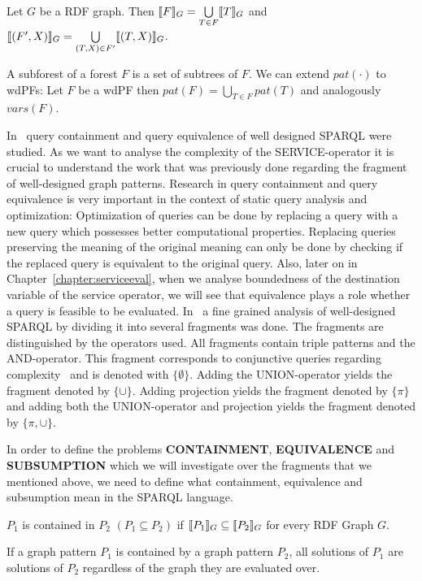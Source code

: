 \begin{definition}
Let $G$ be a RDF graph. 
Then $\llbracket F \rrbracket_G = \bigcup\limits_{T\in F}\llbracket T \rrbracket_G$ and $\llbracket(F',X)\rrbracket_G =
\bigcup\limits_{(T,X) \in F'} \llbracket (T,X) \rrbracket_G$. 
\end{definition}


A subforest of a forest $F$ is a set of subtrees of $F$.
We can extend $pat(\cdot)$ to wdPFs: Let $F$ be a wdPF then $pat(F) =
\bigcup\limits_{T \in F}  pat(T)$ and analogously $vars(F)$.

In~\cite{pichler2014containment} query containment and query equivalence of well
designed SPARQL were studied. As we want to analyse the
complexity of the SERVICE-operator it is crucial to understand the work that was
previously done regarding the fragment of well-designed graph patterns.
Research in query containment and query equivalence is very important in the
context of static query analysis and optimization: Optimization of queries can
be done by replacing a query with a new query which possesses better computational properties. 
Replacing queries
preserving the meaning of the original meaning can only be done by checking if
the replaced query is equivalent to the original query. Also, later on in
Chapter~\ref{chapter:serviceeval}, when we analyse
boundedness of the destination variable of the service operator, we will see
that equivalence plays a role whether a query is feasible to be
evaluated. 
In~\cite{pichler2014containment} a fine grained analysis of well-designed SPARQL by
dividing it into several fragments was done. The fragments are distinguished by
the operators used. All fragments contain triple patterns and the AND-operator. This
fragment corresponds to conjunctive queries regarding complexity~\cite{letelier2013static} 
and is denoted with $\{\emptyset\}$. Adding the UNION-operator yields the fragment 
denoted by $\{\cup\}$. Adding projection yields the fragment denoted by $\{\pi\}$ 
and adding both the UNION-operator and projection yields the fragment denoted by $\{\pi,\cup\}$.

In order to define the problems \textbf{CONTAINMENT}, \textbf{EQUIVALENCE} and
\textbf{SUBSUMPTION} which we will investigate over the fragments that we
mentioned above, we need to define what containment, equivalence and subsumption mean
in the SPARQL language.
\begin{definition}[Containment]
\medskip\noindent $P_1$ is contained in $P_2$ $(P_1 \subseteq P_2)$ 
if $\llbracket P_1 \rrbracket_G \subseteq
\llbracket P_2 \rrbracket_G$ for every RDF Graph $G$.
\end{definition}
If a graph pattern $P_1$ is contained by a graph pattern $P_2$, all
solutions of $P_1$ are solutions of $P_2$ regardless of the graph
they are evaluated over.

